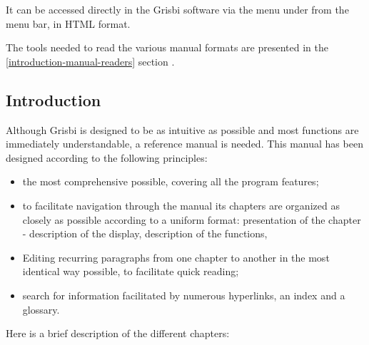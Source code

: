 It can be accessed directly in the Grisbi software via the menu under  from the menu bar, in HTML format.


The tools needed to read the various manual formats are presented in the  \vref{introduction-manual-readers} section .

\subsection{Introduction \label{introduction-manual-presentation}}

Although Grisbi is designed to be as intuitive as possible and most functions are immediately understandable, a reference manual is needed. This manual has been designed according to the following principles:

\begin{itemize}

\item the most comprehensive possible, covering all the program features;

\item to facilitate navigation through the manual its chapters are organized as closely as possible according to a uniform format: presentation of the chapter - description of the display, description of the functions, 

\item Editing recurring paragraphs from one chapter to another in the most identical way possible, to facilitate quick reading;

\item search for information facilitated by numerous \gls{hyperlinks}, an index and a glossary.

\end{itemize}



Here is a brief description of the different chapters:

